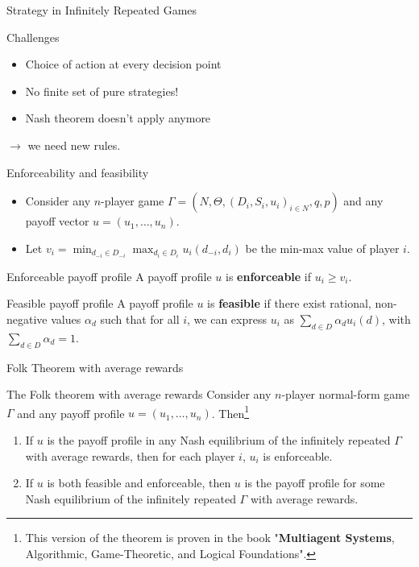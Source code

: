\begin{frame}{Strategy in Infinitely Repeated Games}
    \begin{alertblock}{Challenges}
        \begin{itemize}
            \item Choice of action at every decision point
            \item No finite set of pure strategies!
            \item Nash theorem doesn't apply anymore
        \end{itemize}
        $\rightarrow$ we need new rules.
    \end{alertblock}
\end{frame}

\begin{frame}{Enforceability and feasibility}
    \begin{itemize}
        \item Consider any $n$-player game $\Gamma = (N, \Theta, (D_i, S_i, u_i)_{i\in N}, q, p)$ and any payoff vector
        $u = (u_1, \dots, u_n)$.
        \item Let $v_i= \min_{d_{-i}\in D_{-i}} \max_{d_i\in D_i} u_i(d_{-i}, d_i)$ be
        the min-max value of player $i$.
    \end{itemize}

    \begin{block}{Enforceable payoff profile}
        A payoff profile $u$ is \textbf{enforceable} if $u_i \geq v_i$.
    \end{block}

    \begin{block}{Feasible payoff profile}
        A payoff profile $u$ is \textbf{feasible} if there exist rational, non-negative
        values $\alpha_d$ such that for all $i$, we can express $u_i$ as
        $\sum_{d\in D} \alpha_d u_i(d)$, with $\sum_{d\in D} \alpha_d = 1$.
    \end{block}
\end{frame}

\begin{frame}{Folk Theorem with average rewards}

    \begin{block}{The Folk theorem with average rewards}
        Consider any $n$-player normal-form game $\Gamma$ and any payoff profile
        $u = (u_1, \dots, u_n)$. Then\footnote{This version of the theorem is proven
        in the book "\textbf{Multiagent Systems}, Algorithmic, Game-Theoretic, and Logical
        Foundations".}
        \begin{enumerate}
            \item If $u$ is the payoff profile in any Nash equilibrium of the infinitely
            repeated $\Gamma$ with average rewards, then for each player $i$, $u_i$ is enforceable.
            \item If $u$ is both feasible and enforceable, then $u$ is the payoff profile for some
            Nash equilibrium of the infinitely repeated $\Gamma$ with average rewards.
        \end{enumerate}
    \end{block}
\end{frame}

